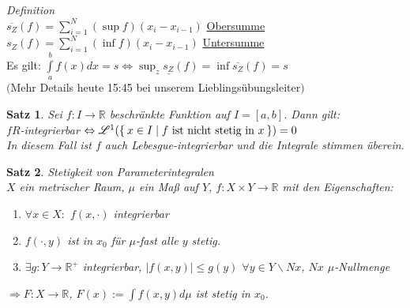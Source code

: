 \documentclass[11pt]{memoir}
\theoremstyle{changebreak}
\newtheorem{Satz}{Satz}[chapter]
\begin{document}
\emph{Definition} \\
$\overline{s_Z}(f) = \sum\limits_{i=1}^N (\sup f)(x_i  - x_{i-1})$ \underline{Obersumme} \\
\underline{$s_Z$}$(f) = \sum\limits_{i=1}^N (\inf f)(x_i - x_{i-1})$ \underline{Untersumme} \\
Es gilt:
$\int\limits_a^b f(x) dx = s \Leftrightarrow \sup_z \underline{s_Z}(f) = \inf \overline{s_Z}(f) = s$ \\
$($Mehr Details heute 15:45 bei unserem Lieblingsübungsleiter$)$

\begin{Satz}
Sei $f: I \rightarrow \mathbb R$ beschränkte Funktion auf $I = [a, b]$. Dann gilt: \\
$f R$-integrierbar $\Leftrightarrow \mathscr L^1(\Set{x \in I | f \text{ ist nicht stetig in } x }) = 0$ \\
In diesem Fall ist $f$ auch Lebesgue-integrierbar und die Integrale stimmen überein.
\end{Satz}



\begin{Satz}
\emph{Stetigkeit von Parameterintegralen} \\
$X$ ein metrischer Raum, $\mu$ ein Maß auf $Y$, $f: X \times Y \rightarrow \mathbb R$ mit den Eigenschaften:
\begin{enumerate}
	\item $\forall x \in X:$ $f(x, \cdotp)$ integrierbar
	\item $f(\cdotp, y)$ ist in $x_0$ für $\mu$-fast alle $y$ stetig.
	\item $\exists g: Y \rightarrow \mathbb R^+$ integrierbar, $|f(x, y)| \leq g(y)$ $\forall y \in Y \backslash Nx$, $Nx$ $\mu$-Nullmenge
\end{enumerate}
$\Rightarrow F: X \rightarrow \mathbb R$, $F(x):= \int f(x, y) d\mu$ ist stetig in $x_0$.
\end{Satz}
\end{document}
